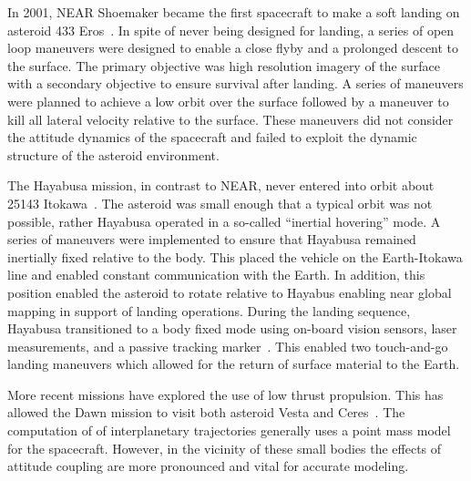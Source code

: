 \documentclass[11pt]{article} %
\begin{document}
In 2001, NEAR Shoemaker became the first spacecraft to make a soft landing on asteroid 433 Eros~\cite{antreasian2002}.
In spite of never being designed for landing, a series of open loop maneuvers were designed to enable a close flyby and a prolonged descent to the surface.
The primary objective was high resolution imagery of the surface with a secondary objective to ensure survival after landing.
A series of maneuvers were planned to achieve a low orbit over the surface followed by a maneuver to kill all lateral velocity relative to the surface. 
These maneuvers did not consider the attitude dynamics of the spacecraft and failed to exploit the dynamic structure of the asteroid environment.

The Hayabusa mission, in contrast to NEAR, never entered into orbit about 25143 Itokawa~\cite{kubota2006}.
The asteroid was small enough that a typical orbit was not possible, rather Hayabusa operated in a so-called ``inertial hovering'' mode.
A series of maneuvers were implemented to ensure that Hayabusa remained inertially fixed relative to the body. 
This placed the vehicle on the Earth-Itokawa line and enabled constant communication with the Earth.
In addition, this position enabled the asteroid to rotate relative to Hayabus enabling near global mapping in support of landing operations.
During the landing sequence, Hayabusa transitioned to a body fixed mode using on-board vision sensors, laser measurements, and a passive tracking marker~\cite{kubota2005}. 
This enabled two touch-and-go landing maneuvers which allowed for the return of surface material to the Earth. 

More recent missions have explored the use of low thrust propulsion.
This has allowed the Dawn mission to visit both asteroid Vesta and Ceres~\cite{rayman2006}.
The computation of of interplanetary trajectories generally uses a point mass model for the spacecraft.
However, in the vicinity of these small bodies the effects of attitude coupling are more pronounced and vital for accurate modeling. 
\end{document}
